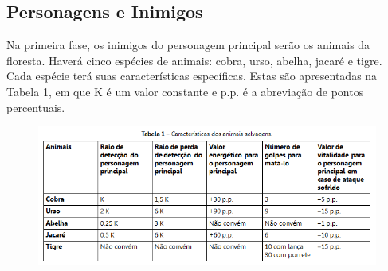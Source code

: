 \subsection{Personagens e Inimigos}
Na primeira fase, os inimigos do personagem principal serão os animais da floresta. 
Haverá cinco espécies de animais: cobra, urso, abelha, jacaré e tigre. Cada espécie 
terá suas características específicas. Estas são apresentadas na Tabela 1, em que K 
é um valor constante e p.p. é a abreviação de pontos percentuais.

\begin{figure}[!ht]
 \centering
 \includegraphics[scale=0.6]{tabela.png}
 \caption{}
 \label{img:reason}
\end{figure}
